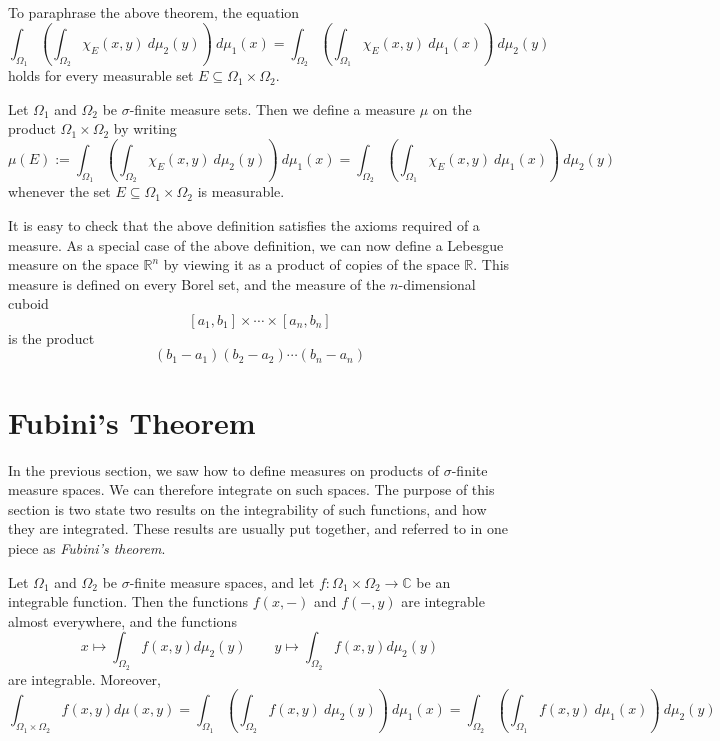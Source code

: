 To paraphrase the above theorem, the equation
$$\int_{\Omega_1} \left( \int_{\Omega_2}  \chi_E (x,y) \ d\mu_2 (y) \right) \ d\mu_1 (x)= \int_{\Omega_2} \left( \int_{\Omega_1} \chi_E (x,y) \ d\mu_1 (x) \right) \ d\mu_2 (y)$$ 
holds for every measurable set $E\subseteq \Omega_1 \times \Omega_2$.

\begin{definition}
Let $\Omega_1$ and $\Omega_2$ be $\sigma$-finite measure sets.  Then we define a measure $\mu$ on the product $\Omega_1 \times \Omega_2$ by writing
$$\mu (E) := \int_{\Omega_1} \left( \int_{\Omega_2}  \chi_E (x,y) \ d\mu_2 (y) \right) \ d\mu_1 (x)= \int_{\Omega_2} \left( \int_{\Omega_1} \chi_E (x,y) \ d\mu_1 (x) \right) \ d\mu_2 (y)$$ 
whenever the set $E\subseteq \Omega_1 \times \Omega_2$ is measurable.
\end{definition}

It is easy to check that the above definition satisfies the axioms required of a measure.  As a special case of the above definition, we can now define a Lebesgue measure on the space ${\mathbb R}^n$ by viewing it as a product of copies of the space $\mathbb R$.  This measure is defined on every Borel set, and the measure of the $n$-dimensional cuboid
$$[a_1 , b_1] \times \cdots \times [a_n , b_n]$$
is the product
$$(b_1 - a_1)(b_2-a_2) \cdots (b_n-a_n)$$
 
\section{Fubini's Theorem}

In the previous section, we saw how to define measures on products of $\sigma$-finite measure spaces.  We can therefore integrate on such spaces.  The purpose of this section is two state two results on the integrability of such functions, and how they are integrated.   These results are usually put together, and referred to in one piece as {\em Fubini's theorem}.

\begin{theorem}
Let $\Omega_1$ and $\Omega_2$ be $\sigma$-finite measure spaces, and let $f\colon \Omega_1 \times \Omega_2 \rightarrow {\mathbb C}$ be an integrable function.  Then the functions $f(x,-)$ and $f(-,y)$ are integrable almost everywhere, and the functions
$$x\mapsto \int_{\Omega_2} f(x,y) d\mu_2 (y) \qquad y\mapsto \int_{\Omega_2} f(x,y) d\mu_2 (y)$$
are integrable.  Moreover,
$$\int_{\Omega_1 \times \Omega_2} f(x,y) d\mu (x,y)
=\int_{\Omega_1} \left( \int_{\Omega_2}  f (x,y) \ d\mu_2 (y) \right) \ d\mu_1 (x)= \int_{\Omega_2} \left( \int_{\Omega_1} f (x,y) \ d\mu_1 (x) \right) \ d\mu_2 (y)$$ 
\end{theorem}


